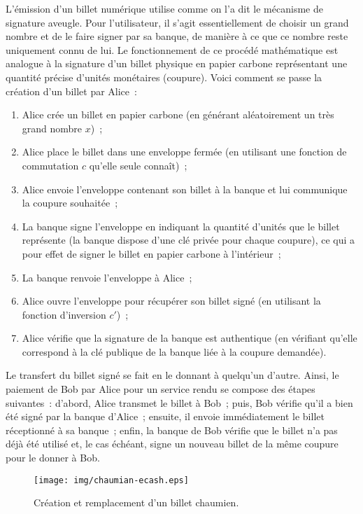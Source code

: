 L'émission d'un billet numérique utilise comme on l'a dit le mécanisme de signature aveugle. Pour l'utilisateur, il s'agit essentiellement de choisir un grand nombre et de le faire signer par sa banque, de manière à ce que ce nombre reste uniquement connu de lui. Le fonctionnement de ce procédé mathématique est analogue à la signature d'un billet physique en papier carbone représentant une quantité précise d'unités monétaires (coupure). Voici comment se passe la création d'un billet par Alice~:

\begin{enumerate}
\item Alice crée un billet en papier carbone (en générant aléatoirement un très grand nombre $x$)~;
\item Alice place le billet dans une enveloppe fermée (en utilisant une fonction de commutation $c$ qu'elle seule connaît)~;
\item Alice envoie l'enveloppe contenant son billet à la banque et lui communique la coupure souhaitée~;
\item La banque signe l'enveloppe en indiquant la quantité d'unités que le billet représente (la banque dispose d'une clé privée pour chaque coupure), ce qui a pour effet de signer le billet en papier carbone à l'intérieur~;
\item La banque renvoie l'enveloppe à Alice~;
\item Alice ouvre l'enveloppe pour récupérer son billet signé (en utilisant la fonction d'inversion $c'$)~;
\item Alice vérifie que la signature de la banque est authentique (en vérifiant qu'elle correspond à la clé publique de la banque liée à la coupure demandée).
\end{enumerate}

Le transfert du billet signé se fait en le donnant à quelqu'un d'autre. Ainsi, le paiement de Bob par Alice pour un service rendu se compose des étapes suivantes~: d'abord, Alice transmet le billet à Bob~; puis, Bob vérifie qu'il a bien été signé par la banque d'Alice~; ensuite, il envoie immédiatement le billet réceptionné à sa banque~; enfin, la banque de Bob vérifie que le billet n'a pas déjà été utilisé et, le cas échéant, signe un nouveau billet de la même coupure pour le donner à Bob.

\begin{figure}[h]
  \centering
  \texttt{[image: img/chaumian-ecash.eps]}
  \caption{Création et remplacement d'un billet chaumien.}
\end{figure}

